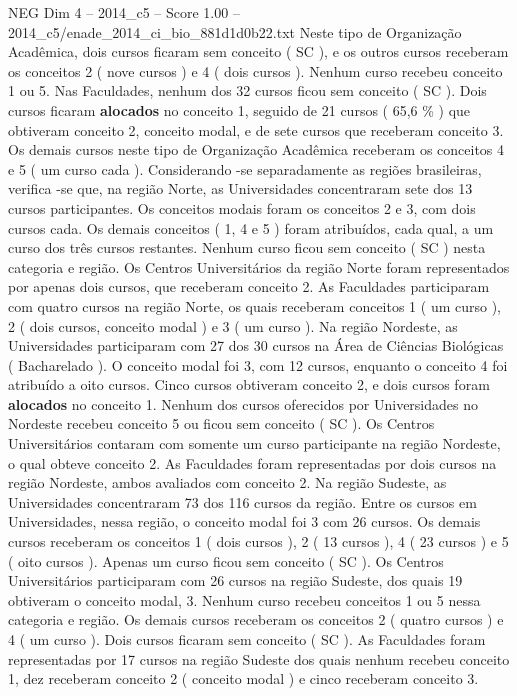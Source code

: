 \begin{textsample}{NEG Dim 4 – 2014\_c5 – Score 1.00 – 2014\_c5/enade\_2014\_ci\_bio\_881d1d0b22.txt}
Neste tipo de Organização Acadêmica, dois cursos ficaram sem conceito ( SC ), e os outros cursos receberam os conceitos 2 ( nove cursos ) e 4 ( dois cursos ).
Nenhum curso recebeu conceito 1 ou 5.
Nas Faculdades, nenhum dos 32 cursos ficou sem conceito ( SC ).
Dois cursos ficaram \textbf{alocados} no conceito 1, seguido de 21 cursos ( 65,6 \% ) que obtiveram conceito 2, conceito modal, e de sete cursos que receberam conceito 3.
Os demais cursos neste tipo de Organização Acadêmica receberam os conceitos 4 e 5 ( um curso cada ).
Considerando -se separadamente as regiões brasileiras, verifica -se que, na região Norte, as Universidades concentraram sete dos 13 cursos participantes.
Os conceitos modais foram os conceitos 2 e 3, com dois cursos cada.
Os demais conceitos ( 1, 4 e 5 ) foram atribuídos, cada qual, a um curso dos três cursos restantes.
Nenhum curso ficou sem conceito ( SC ) nesta categoria e região.
Os Centros Universitários da região Norte foram representados por apenas dois cursos, que receberam conceito 2.
As Faculdades participaram com quatro cursos na região Norte, os quais receberam conceitos 1 ( um curso ), 2 ( dois cursos, conceito modal ) e 3 ( um curso ).
Na região Nordeste, as Universidades participaram com 27 dos 30 cursos na Área de Ciências Biológicas ( Bacharelado ).
O conceito modal foi 3, com 12 cursos, enquanto o conceito 4 foi atribuído a oito cursos.
Cinco cursos obtiveram conceito 2, e dois cursos foram \textbf{alocados} no conceito 1.
Nenhum dos cursos oferecidos por Universidades no Nordeste recebeu conceito 5 ou ficou sem conceito ( SC ).
Os Centros Universitários contaram com somente um curso participante na região Nordeste, o qual obteve conceito 2.
As Faculdades foram representadas por dois cursos na região Nordeste, ambos avaliados com conceito 2.
Na região Sudeste, as Universidades concentraram 73 dos 116 cursos da região.
Entre os cursos em Universidades, nessa região, o conceito modal foi 3 com 26 cursos.
Os demais cursos receberam os conceitos 1 ( dois cursos ), 2 ( 13 cursos ), 4 ( 23 cursos ) e 5 ( oito cursos ).
Apenas um curso ficou sem conceito ( SC ).
Os Centros Universitários participaram com 26 cursos na região Sudeste, dos quais 19 obtiveram o conceito modal, 3.
Nenhum curso recebeu conceitos 1 ou 5 nessa categoria e região.
Os demais cursos receberam os conceitos 2 ( quatro cursos ) e 4 ( um curso ).
Dois cursos ficaram sem conceito ( SC ).
As Faculdades foram representadas por 17 cursos na região Sudeste dos quais nenhum recebeu conceito 1, dez receberam conceito 2 ( conceito modal ) e cinco receberam conceito 3.

\end{textsample}
